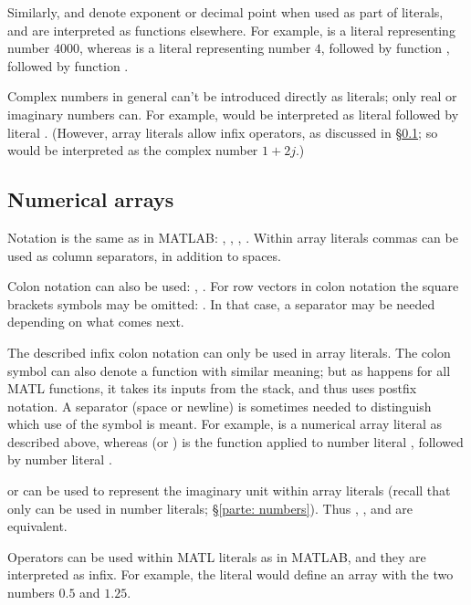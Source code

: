 \documentclass[12pt]{article}
\newcommand{\matl}[1]{{\ttfamily\color{fgmatl}{\hl{#1}}}} %
\begin{document}
Similarly, \matl{e} and \matl{.} denote exponent or decimal point when used as part of literals, and are interpreted as functions elsewhere. For example, \matl{4e3} is a literal representing number $4000$, whereas \matl{4e+} is a literal representing number $4$, followed by function \matl{e}, followed by function \matl{+}.

Complex numbers in general can't be introduced directly as literals; only real or imaginary numbers can. For example, \matl{1-2j} would be interpreted as literal \matl{1} followed by literal \matl{-2j}. (However, array literals allow infix operators, as discussed in \S\ref{parte: numerical arrays}; so \matl{[1+2j]} would be interpreted as the complex number $1+2j$.)

\subsection{Numerical arrays}
\label{parte: numerical arrays}

Notation is the same as in MATLAB: \matl{[1 2 3]}, \matl{[1,2,3]}, \matl{[1,2j;3e4,-.2e-5]}, \matl{[]}. Within array literals commas can be used as column separators, in addition to spaces.

Colon notation can also be used: \matl{[1:4;3 7 5 8]}, \matl{[1:2:5;0 0 -1]}. For row vectors in colon notation the square brackets symbols may be omitted: \matl{.5:.5:10}. In that case, a separator may be needed depending on what comes next.

The described infix colon notation can only be used in array literals. The colon symbol can also denote a function with similar meaning; but as happens for all MATL functions, it takes its inputs from the stack, and thus uses postfix notation. A separator (space or newline) is sometimes needed to distinguish which use of the symbol \matl{:} is meant. For example, \matl{5:8} is a numerical array literal as described above, whereas \matl{5: 8} (or \matl{5 :8} ) is the \matl{:} function applied to number literal \matl{5}, followed by number literal \matl{8}.

\matl{j} or \matl{i} can be used to represent the imaginary unit within array literals (recall that only \matl{j} can be used in number literals; \S\ref{parte: numbers}). Thus \matl{[0 j]}, \matl{[0 1j]}, \matl{[0 i]} and \matl{[0 1i]} are equivalent.

Operators can be used within MATL literals as in MATLAB, and they are interpreted as infix. For example, the literal \matl{[1/2 1+1/4]} would define an array with the two numbers $0.5$ and $1.25$.
\end{document}
